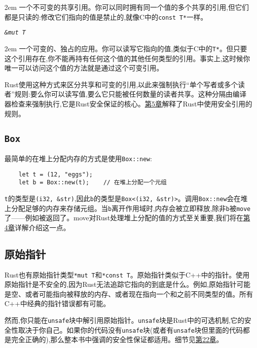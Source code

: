 \hangindent 2em
\noindent
一个不可变的共享引用。你可以同时拥有同一个值的多个共享的引用,但它们都是只读的:修改它们指向的值是禁止的,就像C中的\texttt{const T*}一样。

\begin{flushleft}
    \emph{\texttt{\&mut T}}
\end{flushleft}

\hangindent 2em
\noindent
一个可变的、独占的应用。你可以读写它指向的值,类似于C中的\texttt{T*}。但只要这个引用存在,你不能再持有任何这个值的其他任何类型的引用。事实上,这时候你唯一可以访问这个值的方法就是通过这个可变引用。

Rust使用这种方式来区分共享和可变的引用,以此来强制执行“单个写者或多个读者”规则:要么你可以读写值,要么它只能被任何数量的读者共享。这种分隔由编译器检查来强制执行,它是Rust安全保证的核心。\hyperref[ch05]{第5章}解释了Rust中使用安全引用的规则。

\subsection{\texttt{Box}}

最简单的在堆上分配内存的方式是使用\texttt{Box::new}:
\begin{verbatim}
    let t = (12, "eggs");
    let b = Box::new(t);    // 在堆上分配一个元组
\end{verbatim}

\texttt{t}的类型是\texttt{(i32, \&str)},因此\texttt{b}的类型是\texttt{Box<(i32, \&str)>}。调用\texttt{Box::new}会在堆上分配足够的内存来存储元组。当\texttt{b}离开作用域时,内存会被立即释放,除非\texttt{b}被\texttt{move}了——例如被返回了。move对Rust处理堆上分配的值的方式至关重要,我们将在\hyperref[ch04]{第4章}详解介绍这一点。

\subsection{原始指针}

Rust也有原始指针类型\texttt{*mut T}和\texttt{*const T}。原始指针类似于C++中的指针。使用原始指针是不安全的,因为Rust无法追踪它指向的到底是什么。例如,原始指针可能是空、或者可能指向被释放的内存、或者现在指向一个和之前不同类型的值。所有C++中经典的指针错误都有可能。

然而,你只能在\texttt{unsafe}块中解引用原始指针。\texttt{unsafe}块是Rust中的可选机制,它的安全性取决于你自己。如果你的代码没有\texttt{unsafe}块(或者有\texttt{unsafe}块但里面的代码都是完全正确的),那么整本书中强调的安全性保证都适用。细节见\hyperref[ch22]{第22章}。

